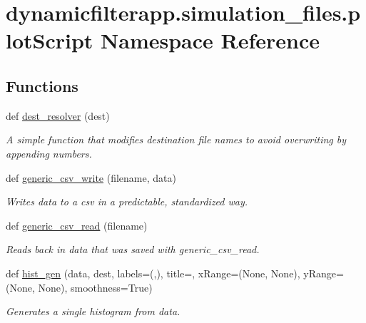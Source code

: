 \hypertarget{namespacedynamicfilterapp_1_1simulation__files_1_1plot_script}{}\section{dynamicfilterapp.\+simulation\+\_\+files.\+plot\+Script Namespace Reference}
\label{namespacedynamicfilterapp_1_1simulation__files_1_1plot_script}
\subsection*{Functions}
\begin{DoxyCompactItemize}
\item 
def \mbox{\hyperlink{namespacedynamicfilterapp_1_1simulation__files_1_1plot_script_a033562135f6f14ea0309f28fcf326ce9}{dest\+\_\+resolver}} (dest)
\begin{DoxyCompactList}\small\item\em A simple function that modifies destination file names to avoid overwriting by appending numbers. \end{DoxyCompactList}\item 
def \mbox{\hyperlink{namespacedynamicfilterapp_1_1simulation__files_1_1plot_script_afc50b7236c9fe752b68c9fe393c26230}{generic\+\_\+csv\+\_\+write}} (filename, data)
\begin{DoxyCompactList}\small\item\em Writes data to a csv in a predictable, standardized way. \end{DoxyCompactList}\item 
def \mbox{\hyperlink{namespacedynamicfilterapp_1_1simulation__files_1_1plot_script_a471203f34a5e5a8da0a8dae81ef6ddc7}{generic\+\_\+csv\+\_\+read}} (filename)
\begin{DoxyCompactList}\small\item\em Reads back in data that was saved with generic\+\_\+csv\+\_\+read. \end{DoxyCompactList}\item 
def \mbox{\hyperlink{namespacedynamicfilterapp_1_1simulation__files_1_1plot_script_adc58c0bae220ebecc2001221654f8b50}{hist\+\_\+gen}} (data, dest, labels=(\textquotesingle{}\textquotesingle{},\textquotesingle{}\textquotesingle{}), title=\textquotesingle{}\textquotesingle{}, x\+Range=(None, None), y\+Range=(None, None), smoothness=True)
\begin{DoxyCompactList}\small\item\em Generates a single histogram from data. \end{DoxyCompactList}\item 

\end{DoxyCompactItemize}
